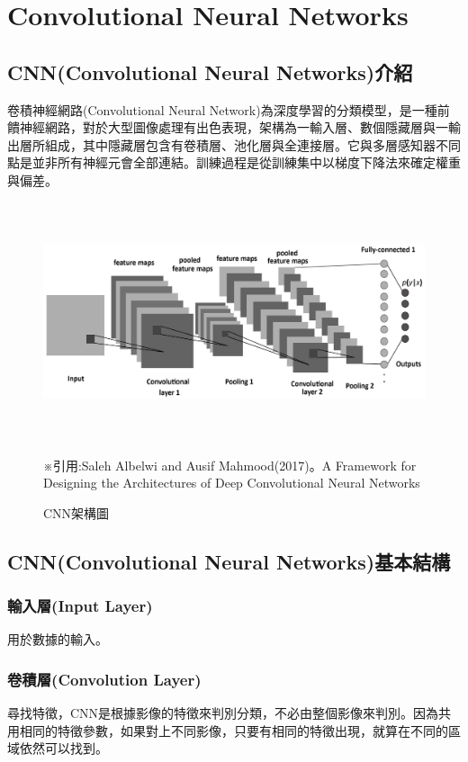 \chapter{Convolutional Neural Networks}
\label{chapter:intro}
\section{CNN(Convolutional Neural Networks)介紹}
卷積神經網路(Convolutional Neural Network)為深度學習的分類模型，是一種前饋神經網路，對於大型圖像處理有出色表現，架構為一輸入層、數個隱藏層與一輸出層所組成，其中隱藏層包含有卷積層、池化層與全連接層。它與多層感知器不同點是並非所有神經元會全部連結。訓練過程是從訓練集中以梯度下降法來確定權重與偏差。
\begin{figure}[H]
	\centerline{\includegraphics[height=7cm]{pic/CNNAR.png}}
	\caption{CNN架構圖}
	※引用:Saleh Albelwi and Ausif Mahmood(2017)。A Framework for Designing the Architectures of Deep Convolutional Neural Networks

	\label{fig:CNNAR}
\end{figure}


\label{sec:background}
\section{CNN(Convolutional Neural Networks)基本結構}
\subsection{輸入層(Input Layer)}
用於數據的輸入。
\subsection{卷積層(Convolution Layer)}

尋找特徵，CNN是根據影像的特徵來判別分類，不必由整個影像來判別。因為共用相同的特徵參數，如果對上不同影像，只要有相同的特徵出現，就算在不同的區域依然可以找到。


